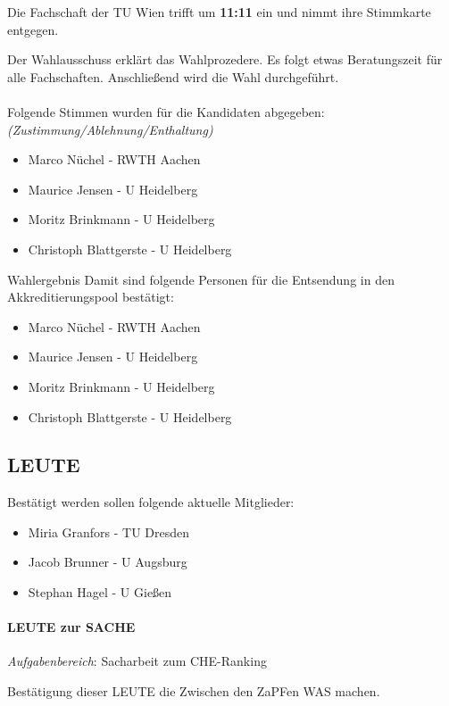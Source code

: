     \begin{info}{}
      Die Fachschaft der TU Wien trifft um \textbf{11:11} ein und nimmt ihre Stimmkarte entgegen.
    \end{info}

    Der Wahlausschuss erklärt das Wahlprozedere.
    Es folgt etwas Beratungszeit für alle Fachschaften. Anschließend wird die Wahl durchgeführt. \\ \\

    Folgende Stimmen wurden für die Kandidaten abgegeben: \textit{(Zustimmung/Ablehnung/Enthaltung)}
    \begin{itemize}
      \item Marco Nüchel - RWTH Aachen
      \item Maurice Jensen - U Heidelberg
      \item Moritz Brinkmann - U Heidelberg
      \item Christoph Blattgerste - U Heidelberg
    \end{itemize}

    \begin{success}{Wahlergebnis}
      Damit sind folgende Personen für die Entsendung in den Akkreditierungspool bestätigt:
      \begin{itemize}
        \item Marco Nüchel - RWTH Aachen
        \item Maurice Jensen - U Heidelberg
        \item Moritz Brinkmann - U Heidelberg
        \item Christoph Blattgerste - U Heidelberg
      \end{itemize}
    \end{success}

  \subsection{LEUTE}
      Bestätigt werden sollen folgende aktuelle Mitglieder:
      \begin{itemize}
        \item Miria Granfors - TU Dresden
        \item Jacob Brunner - U Augsburg
        \item Stephan Hagel - U Gießen
      \end{itemize}
    \paragraph{LEUTE zur SACHE}
      \textit{Aufgabenbereich}: Sacharbeit zum CHE-Ranking
      \begin{success}
        Bestätigung dieser LEUTE die Zwischen den ZaPFen WAS machen.
      \end{success}

